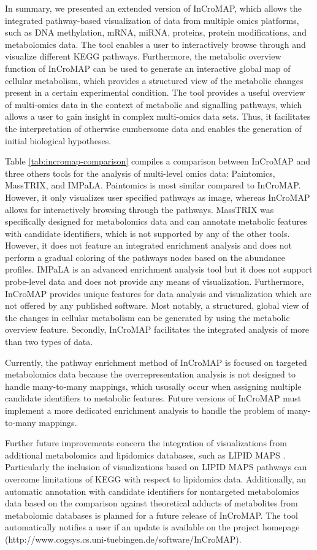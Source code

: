 \documentclass[final,5p,times,twocolumn]{elsarticle}
\newcommand\red[1]{{\color{red}#1}}
\begin{document}
\red{In summary,} we presented an extended version of InCroMAP, which allows the integrated pathway-based visualization of data from multiple omics platforms, such as DNA methylation, mRNA, miRNA, proteins, protein modifications, and metabolomics data. The tool enables a user to interactively browse through and visualize different KEGG pathways. Furthermore, the metabolic overview function of InCroMAP can be used to generate an interactive global map of cellular metabolism, which provides a structured view of the metabolic changes present in a certain experimental condition. The tool provides a useful overview of multi-omics data in the context of metabolic and signalling pathways, which allows a user to gain insight in complex multi-omics data sets. Thus, it facilitates the interpretation of otherwise cumbersome data and enables the generation of initial biological hypotheses.

Table \ref{tab:incromap-comparison} compiles a comparison between InCroMAP and three others tools for the analysis of multi-level omics data: Paintomics, MassTRIX, and IMPaLA. Paintomics is most similar compared to InCroMAP. However, it only visualizes user specified pathways as image, whereas InCroMAP allows for interactively browsing through the pathways. MassTRIX was specifically  designed for metabolomics data and can annotate metabolic features with candidate identifiers, which is not supported by any of the other tools. However, it does not feature an integrated enrichment analysis and does not perform a gradual coloring of the pathways nodes based on the abundance profiles. IMPaLA is an advanced enrichment analysis tool but it does not support probe-level data and does not provide any means of visualization. Furthermore, InCroMAP provides unique features for data analysis and visualization which are not offered by any published software.  Most notably, a structured, global view of the changes in cellular metabolism can be generated by using the metabolic overview feature. Secondly, InCroMAP facilitates the integrated analysis of more than two types of data.

Currently, the pathway enrichment method of InCroMAP is focused on targeted metabolomics data because the overrepresentation analysis is not designed to handle many-to-many mappings, which ususally occur when assigning multiple candidate identifiers to metabolic features. Future versions of InCroMAP must implement a more dedicated enrichment analysis to handle the problem of many-to-many mappings.

Further future improvements concern the integration of visualizations from additional metabolomics and lipidomics databases, such as LIPID MAPS \cite{Sud2007}. Particularly the inclusion of visualizations based on LIPID MAPS pathways can overcome limitations of KEGG with respect to lipidomics data. Additionally, an automatic annotation with candidate identifiers for nontargeted metabolomics data based on the comparison against theoretical adducts of metabolites from metabolomic databases is planned for a future release of InCroMAP. The tool automatically notifies a user if an update is available on the project homepage (http://www.cogsys.cs.uni-tuebingen.de/software/InCroMAP).
\end{document}
